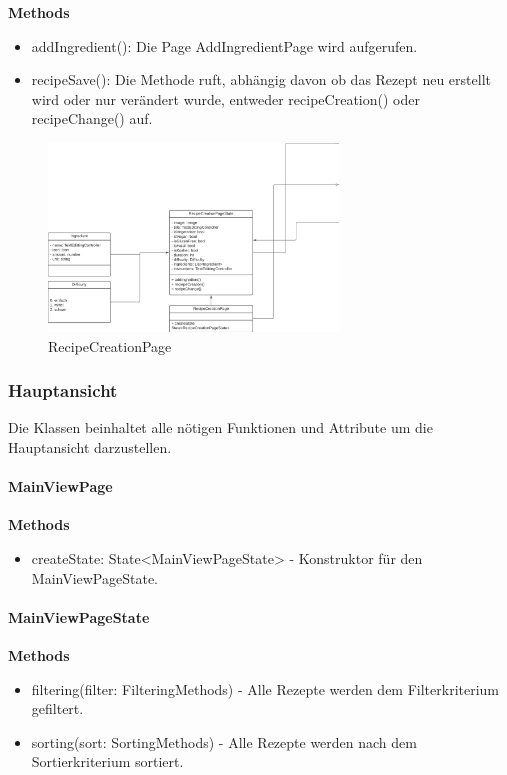 \documentclass[parskip=full]{scrartcl}
\begin{document}
            \textbf{Methods}
                \begin{itemize}
                    \item addIngredient(): Die Page AddIngredientPage wird aufgerufen.
                    \item recipeSave(): Die Methode ruft, abhängig davon ob das Rezept neu erstellt wird oder nur verändert wurde, entweder recipeCreation() oder recipeChange() auf.
                \end{itemize}

       \begin{figure}[htp]
               \centering
               \includegraphics[height = 50mm]{images/presentationLayer/recipeCreationPage.png}
               \caption{RecipeCreationPage}
        \end{figure}


    \newpage


\subsubsection{Hauptansicht}
        Die Klassen beinhaltet alle nötigen Funktionen und Attribute um die Hauptansicht darzustellen.\newline

        \paragraph{MainViewPage}
            \textbf{Methods}
                \begin{itemize}
                    \item createState: State<MainViewPageState> - Konstruktor für den MainViewPageState.
                \end{itemize}
                
        \paragraph{MainViewPageState}
            \textbf{Methods}
                \begin{itemize}
                    \item filtering(filter: FilteringMethods) - Alle Rezepte werden dem Filterkriterium gefiltert.
                    \item sorting(sort: SortingMethods) - Alle Rezepte werden nach dem Sortierkriterium sortiert.
                \end{itemize}
\end{document}
